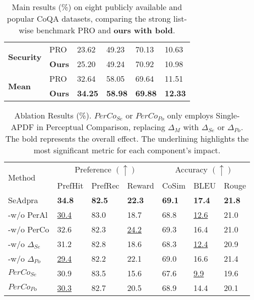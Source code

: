 \begin{table}[h]
\begin{adjustbox}{width=0.48\textwidth}
\begin{tabularx}{0.495\textwidth}{p{1.2cm} p{0.7cm} p{0.95cm}p{0.95cm}p{0.7cm}p{0.7cm}}
    \midrule
    \multirow{2}{*}{\small \textbf{Security}}   & \small PRO & 23.62 & 49.23 & 70.13 & 10.63 \\ 
                                & \small \textbf{Ours} & 25.20 & 49.24 & 70.92 & 10.98 \\ 
    \midrule
    \multirow{2}{*}{\small \textbf{Mean}}       & \small PRO & 32.64 & 58.05 & 69.64 & 11.51 \\ 
                                & \small \textbf{Ours} & \textbf{34.25} & \textbf{58.98} & \textbf{69.88} & \textbf{12.33} \\ 
    \bottomrule
\end{tabularx}
\end{adjustbox}
\caption{Main results (\%) on eight publicly available and popular CoQA datasets, comparing the strong list-wise benchmark PRO and \textbf{ours with bold}.}
\label{public}
\end{table}



\begin{table}[h]
\centering
\renewcommand{\arraystretch}{1.02}
\begin{tabularx}{0.48\textwidth}{p{1.45cm} p{0.56cm} p{0.6cm} p{0.6cm} p{0.50cm} p{0.45cm} X}
\toprule
\multirow{2}{*}{Method} & \multicolumn{3}{c}{Preference \((\uparrow)\)} & \multicolumn{3}{c}{Accuracy \((\uparrow)\)} \\ \cmidrule{2-4} \cmidrule{5-7}
& \small PrefHit & \small PrefRec & \small Reward & \small CoSim & \small BLEU & \small Rouge \\ \midrule
\small{SeAdpra} & \textbf{34.8} & \textbf{82.5} & \textbf{22.3} & \textbf{69.1} & \textbf{17.4} & \textbf{21.8} \\ 
\small{-w/o PerAl} & \underline{30.4} & 83.0 & 18.7 & 68.8 & \underline{12.6} & 21.0 \\
\small{-w/o PerCo} & 32.6 & 82.3 & \underline{24.2} & 69.3 & 16.4 & 21.0 \\
\small{-w/o \(\Delta_{Se}\)} & 31.2 & 82.8 & 18.6 & 68.3 & \underline{12.4} & 20.9 \\
\small{-w/o \(\Delta_{Po}\)} & \underline{29.4} & 82.2 & 22.1 & 69.0 & 16.6 & 21.4 \\
\small{\(PerCo_{Se}\)} & 30.9 & 83.5 & 15.6 & 67.6 & \underline{9.9} & 19.6 \\
\small{\(PerCo_{Po}\)} & \underline{30.3} & 82.7 & 20.5 & 68.9 & 14.4 & 20.1 \\ 
\bottomrule
\end{tabularx}
\caption{Ablation Results (\%). \(PerCo_{Se}\) or \(PerCo_{Po}\) only employs Single-APDF in Perceptual Comparison, replacing \(\Delta_{M}\) with \(\Delta_{Se}\) or \(\Delta_{Po}\). The bold represents the overall effect. The underlining highlights the most significant metric for each component's impact.}
\label{ablation}
\end{table}

